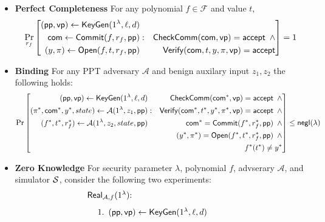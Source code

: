 \begin{itemize}
			\item \textbf{Perfect Completeness}
				For any polynomial $f \in \mathcal{F}$ and value $t$,
				\[\Pr_{r_f}\left[
					\begin{aligned}
						(\pp, \vp) \leftarrow \KeyGen(1^\lambda, \ell, d) && \\
						\comm \leftarrow \Commit(f, r_f, \pp) &:&  \CheckComm(\comm, \vp)=\accept \hspace*{5pt}\land \\
						(y, \pi) \leftarrow \Open(f, t, r_f, \pp) && \hspace*{10pt}\Verify(\comm, t, y, \pi, \vp)=\accept\\
					\end{aligned}
				\right]=1\]
			\item \textbf{Binding}
			For any PPT adversary $\mathcal{A}$ and benign auxilary input $z_1, z_2$ the following holds:
			\[\Pr \left[
				\begin{aligned}
					(\pp, \vp) \leftarrow \KeyGen(1^\lambda, \ell, d) && \CheckComm(\comm^*, \vp)=\accept \hspace*{5pt}\land\\
					(\pi^*, \comm^*, y^*, state) \leftarrow \mathcal{A}(1^\lambda, z_1, \pp) &:& \Verify(\comm^*, t^*, y^*, \pi^*, \vp)=\accept \hspace*{5pt} \land\\
					(f^*, t^*, r_f^*) \leftarrow \mathcal{A}(1^\lambda, z_2, state, \pp) && \comm^*=\Commit(f^*, r_f^*, \pp) \hspace*{5pt} \land\\
					&& (y^*, \pi^*) = \Open(f^*, t^*, r_f^*, \pp) \hspace*{5pt} \land \\
					&& f^*(t^*) \neq y^*\\
				\end{aligned}
			\right]\le \negl{(\lambda)}\]
			\item \textbf{Zero Knowledge} For security parameter $\lambda$, polynomial $f$, advserary $\mathcal{A}$, and simulator $\S$, consider the following two experiments:
				\begin{align*}
					\begin{minipage}{.5\linewidth}
						$\mathsf{Real}_{\A, f}(1^\lambda)$:
						\begin{enumerate}
							\item $(\pp, \vp) \leftarrow \KeyGen(1^\lambda, \ell, d)$

\end{enumerate}
\end{minipage}
\end{align*}
\end{itemize}
